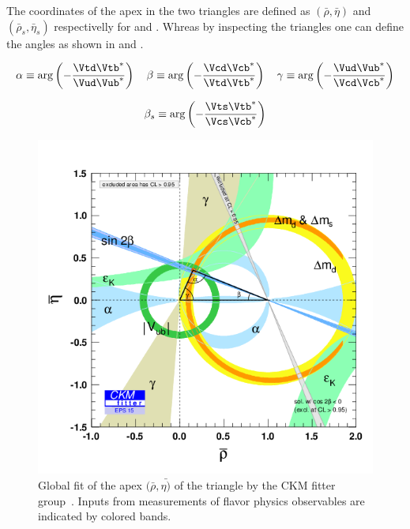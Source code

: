 The coordinates of the apex in the two triangles are defined as $(\bar{\rho},\bar{\eta})$ and $(\bar{\rho}_s,\bar{\eta}_s)$ respectivelly for  and
. Whreas by inspecting the triangles one can define the angles as shown in  and .

\begin{equation}
  \label{bdAnglesDef}
  \alpha \equiv \arg\left( -\frac{\Vtd\Vtb^*}{\Vud\Vub^*} \right)
  \quad
  \beta  \equiv \arg\left( -\frac{\Vcd\Vcb^*}{\Vtd\Vtb^*} \right)
  \quad
  \gamma \equiv \arg\left( -\frac{\Vud\Vub^*}{\Vcd\Vcb^*} \right)
\end{equation}

\begin{equation}
  \label{bsAnglesDef}
  \beta_s \equiv \arg\left( -\frac{\Vts\Vtb^*}{\Vcs\Vcb^*} \right)
\end{equation}

\begin{figure}[h]
  \begin{center}
    \includegraphics[trim=0cm 0cm 0cm 0cm, clip=true, width=\textwidth]{Figures/Chapter1/rhoeta_large.png}
    \caption{Global fit of the apex $(\bar{\rho},\bar{\eta)}$ of the \Bd triangle by the CKM fitter group~\cite{ckm-fitter-phis-pred}.
             Inputs from measurements of flavor physics observables are indicated by colored bands.}
    \label{unitarity_triangle}
  \end{center}
\end{figure}

